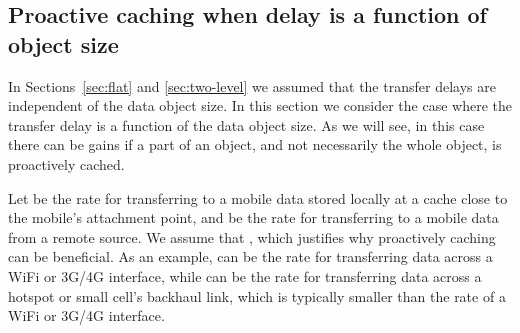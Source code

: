\documentclass[conference]{IEEEtran}
\newcommand{\mynote}[1]{{{\medskip
\footnotesize \em \noindent Note: #1}}\medskip}
\renewcommand{\mynote}[1]{}
\begin{document}
\vspace{-0.09in}
\subsection{Proactive caching when delay is a function of object size}
\label{sec:utility}
\vspace{-0.03in}

\mynote{
\begin{itemize}
\item  Extension of this model to a two-level hierarchy is not straightforward.
\item Perhaps more important, a two-level hierarchy of this model may not correspond to a scenario of practical interest: In a hotspot/small cell topology, the bottleneck is the hotspot/small cell backhaul. To have two-levels, we would need to have a link that is between the WiFi/radio link and the backhaul which has rate . In practical systems, such a link does not exist.
\item An alternative is to write the utility as a function of the average delay, . Indeed, one can argue that such a form is more natural. However, such a form makes the utility  a function of variables , each of which encounter  a different congestion price. This problem is similar to  multipath flow control optimization models. A disadvantage is that it leads to a more complex decision rule compared to (\ref{eq:decision2}).
\item Addition of this model is to make framework more complete. Evaluation results for which model will/can not be included.
\end{itemize}
}


In Sections~\ref{sec:flat} and \ref{sec:two-level} we assumed that the transfer delays   are independent of the data object size.
In this section we consider the case where the transfer delay is a function of the data object size. As we will see, in this case there can be gains if a part of an object, and not necessarily the whole object, is proactively cached.

Let  be the  rate for transferring to a mobile  data  stored locally at a cache close to the mobile's  attachment point, and  be the rate for transferring to a mobile  data from a  remote source. We assume that , which justifies why proactively caching can be beneficial.  As an example,  can be the rate for transferring data across a WiFi or 3G/4G interface, while  can be the rate for transferring data across a hotspot or small cell's backhaul link, which is typically smaller than the rate of a WiFi or 3G/4G interface.
\end{document}
